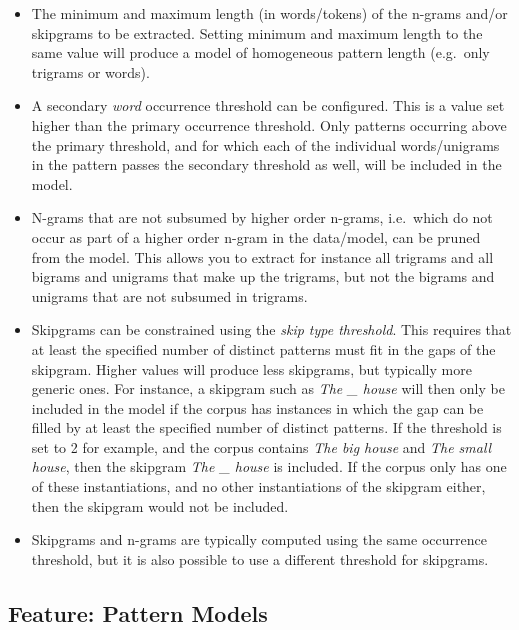 \begin{itemize}
    \item The minimum and maximum length (in words/tokens) of the n-grams
        and/or skipgrams to be extracted. Setting minimum and maximum length to
        the same value will produce a model of homogeneous pattern length
        (e.g.\ only trigrams or words).
    \item A secondary \emph{word} occurrence threshold can be configured. This is a value set higher than
        the primary occurrence threshold. Only patterns
        occurring above the primary threshold, and for which each of the
        individual words/unigrams in the pattern passes the secondary threshold as well, will
        be included in the model.
    \item N-grams that are not subsumed by higher order n-grams, i.e.\ which do
        not  occur as part of a higher order n-gram in the data/model, can be pruned
        from the model. This allows you to extract for instance all trigrams
        and all bigrams and unigrams that make up the trigrams, but not the
        bigrams and unigrams that are not subsumed in trigrams.
    \item Skipgrams can be constrained using the \emph{skip type threshold}. This
        requires that at least the specified number of distinct patterns must fit in the
        gaps of the skipgram. Higher values will produce less skipgrams, but
        typically more generic ones. For instance, a skipgram such as \emph{The \_ house} will
        then only be included in the model if the corpus has instances in which
        the gap can be
        filled by at least the specified number of distinct patterns.
        If the threshold is set to 2 for example, and the corpus contains \emph{The
            big house} and \emph{The small house}, then the skipgram \emph{The
        \_ house} is included. If the corpus only has
        one of these instantiations, and no other instantiations of the
        skipgram either, then the skipgram would not be included.
    \item Skipgrams and n-grams are typically computed using the same
        occurrence threshold, but it is also possible to use a different threshold
        for skipgrams.
\end{itemize}

\subsection*{Feature: Pattern Models}
\label{sec:patternmodels}

